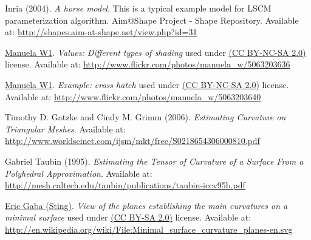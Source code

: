 \begin{thebibliography}{9}

  Inria (2004). \emph{A horse model}. This is a typical example model for LSCM
  parameterization algorithm.  Aim@Shape Project - Shape Repository.
  Available at:
  \url{http://shapes.aim-at-shape.net/view.php?id=31}

  \href{http://www.flickr.com/photos/manuela_w/}{Manuela W1}.  \emph{Values:
  Different types of shading} used under
  \href{http://creativecommons.org/licenses/by-nc-sa/2.0/}{(CC BY-NC-SA 2.0)}
  license.  Available at:
  \url{http://www.flickr.com/photos/manuela_w/5063203636}

  \href{http://www.flickr.com/photos/manuela_w/}{Manuela W1}.  \emph{Example:
  cross hatch} used under
  \href{http://creativecommons.org/licenses/by-nc-sa/2.0/}{(CC BY-NC-SA 2.0)}
  license.  Available at:
  \url{http://www.flickr.com/photos/manuela_w/5063203640}

  Timothy D. Gatzke and Cindy M. Grimm (2006). \emph{Estimating Curvature on
  Triangular Meshes}.  Available at:
  \url{http://www.worldscinet.com/ijsm/mkt/free/S0218654306000810.pdf}

  Gabriel Taubin (1995). \emph{Estimating the Tensor of Curvature of a Surface
  From a Polyhedral Approximation}.  Available at:
  \url{http://mesh.caltech.edu/taubin/publications/taubin-iccv95b.pdf}

  \href{http://commons.wikimedia.org/wiki/User:Sting}{Eric Gaba (Sting)}.
  \emph{View of the planes establishing the main curvatures on a minimal
  surface} used under \href{http://creativecommons.org/licenses/by-sa/2.0/}{(CC
  BY-SA 2.0)} license.  Available at:
  \url{http://en.wikipedia.org/wiki/File:Minimal_surface_curvature_planes-en.svg}

\end{thebibliography}
